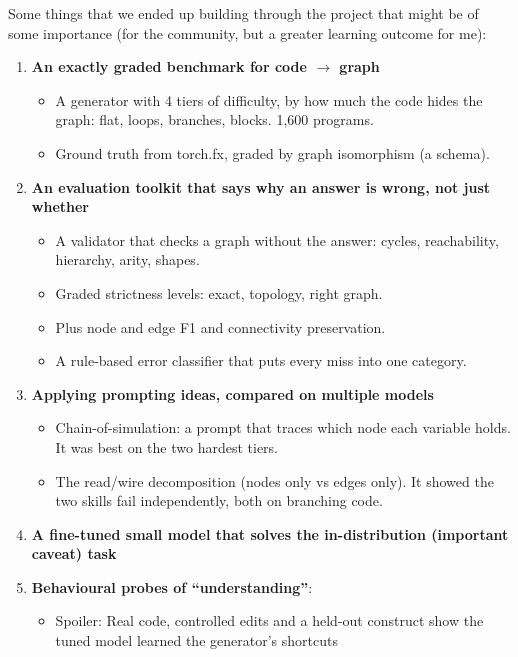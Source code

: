 \documentclass[twoside,english]{article}
\begin{document}
Some things that we ended up building through the project that might be of some importance (for the community, but a greater
learning outcome for me):
\begin{enumerate}
	\item \textbf{An exactly graded benchmark for code $\rightarrow$ graph}
	\begin{itemize}
		\item A generator with 4 tiers of difficulty, by how much the code hides the graph: flat, loops, branches, blocks. 1,600 programs.
		\item Ground truth from torch.fx, graded by graph isomorphism (a schema).
	\end{itemize}
	\item \textbf{An evaluation toolkit that says why an answer is wrong, not just whether}
	\begin{itemize}
		\item A validator that checks a graph without the answer: cycles, reachability, hierarchy, arity, shapes.
		\item Graded strictness levels: exact, topology, right graph.
		\item Plus node and edge F1 and connectivity preservation.
		\item A rule-based error classifier that puts every miss into one category.
	\end{itemize}
	\item \textbf{Applying prompting ideas, compared on multiple models}
	\begin{itemize}
		\item Chain-of-simulation: a prompt that traces which node each variable holds. It was best on the two hardest tiers.
		\item The read/wire decomposition (nodes only vs edges only). It showed the two skills fail independently, both on branching code.
	\end{itemize}
	\item \textbf{A fine-tuned small model that solves the in-distribution (important caveat) task}
	\item \textbf{Behavioural probes of ``understanding''}:
	\begin{itemize}
		\item[] Spoiler: Real code, controlled edits and a held-out construct show the tuned model learned the generator's
		shortcuts
	\end{itemize}
\end{enumerate}
\end{document}
